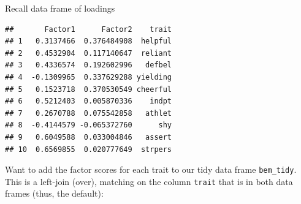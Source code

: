 \documentclass[ignorenonframetext,]{beamer}
\newenvironment{Shaded}{\begin{snugshade}}{\end{snugshade}}
\newcommand{\DecValTok}[1]{\textcolor[rgb]{0.00,0.00,0.81}{#1}}
\newcommand{\KeywordTok}[1]{\textcolor[rgb]{0.13,0.29,0.53}{\textbf{#1}}}
\newcommand{\NormalTok}[1]{#1}
\newcommand{\OperatorTok}[1]{\textcolor[rgb]{0.81,0.36,0.00}{\textbf{#1}}}
\newcommand{\StringTok}[1]{\textcolor[rgb]{0.31,0.60,0.02}{#1}}
\begin{document}
\begin{frame}[fragile]{Recall data frame of loadings}
\protect\hypertarget{recall-data-frame-of-loadings}{}

\footnotesize

\begin{Shaded}
\end{Shaded}

\begin{verbatim}
##       Factor1      Factor2    trait
## 1   0.3137466  0.376484908  helpful
## 2   0.4532904  0.117140647  reliant
## 3   0.4336574  0.192602996   defbel
## 4  -0.1309965  0.337629288 yielding
## 5   0.1523718  0.370530549 cheerful
## 6   0.5212403  0.005870336    indpt
## 7   0.2670788  0.075542858   athlet
## 8  -0.4144579 -0.065372760      shy
## 9   0.6049588  0.033004846   assert
## 10  0.6569855  0.020777649  strpers
\end{verbatim}

\normalsize

Want to add the factor scores for each trait to our tidy data frame
\texttt{bem\_tidy}. This is a left-join (over), matching on the column
\texttt{trait} that is in both data frames (thus, the default):

\end{frame}
\end{document}
